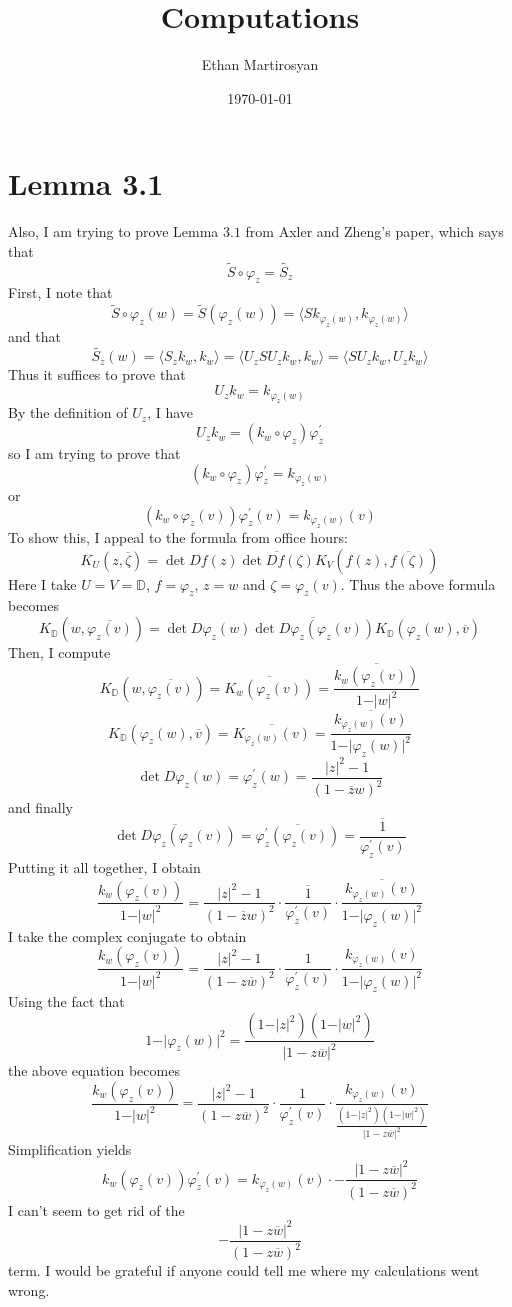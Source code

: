 \documentclass[12pt]{article}
\begin{document}
 
\title{Computations}
\author{Ethan Martirosyan}
\date{\today}
\maketitle
{}
\hfuzz=50pt
\section*{Lemma 3.1}
Also, I am trying to prove Lemma $3.1$ from Axler and Zheng's paper, which says that $$\tilde{S} \circ \varphi_z = \widetilde{S_z}$$ First, I note that $$\tilde{S} \circ \varphi_z (w) = \tilde{S}(\varphi_z(w)) = \langle Sk_{\varphi_z(w)}, k_{\varphi_z(w)} \rangle$$ and that $$\widetilde{S_z}(w) = \langle S_z k_w, k_w \rangle = \langle U_z S U_z k_w, k_w \rangle = \langle S U_z k_w,  U_z k_w \rangle$$ Thus it suffices to prove that $$U_z k_w = k_{\varphi_z(w)}$$ By the definition of $U_z$, I have $$U_z k_w = (k_w \circ \varphi_z) \varphi_z^\prime$$ so I am trying to prove that $$(k_w \circ \varphi_z) \varphi_z^\prime = k_{\varphi_z(w)}$$ or $$(k_w \circ \varphi_z(v)) \varphi_z^\prime(v) = k_{\varphi_z(w)}(v)$$ To show this, I appeal to the formula from office hours: $$K_U(z, \overline{\zeta}) = \det Df(z) \overline{\det Df(\zeta)}  K_V(f(z), \overline{f(\zeta)})$$ Here I take $U = V = \mathbb{D}$, $f = \varphi_z$, $z = w$ and $\zeta = \varphi_z(v)$. Thus the above formula becomes $$K_\mathbb{D}(w,\overline{\varphi_z(v)}) = \det D \varphi_z(w) \overline{\det D \varphi_z(\varphi_z(v))} K_\mathbb{D}(\varphi_z(w), \overline{v})$$ Then, I compute $$K_\mathbb{D}(w,\overline{\varphi_z(v)}) = \overline{K_w(\varphi_z(v))} = \overline{\frac{k_w(\varphi_z(v))}{1 - \vert w \vert^2}}$$ $$K_\mathbb{D}(\varphi_z(w), \overline{v}) = \overline{K_{\varphi_z(w)}(v)} = \overline{\frac{k_{\varphi_z(w)}(v)}{1- \vert \varphi_z(w) \vert^2}}$$ $$\det D \varphi_z(w) = \varphi_z^\prime(w) = \frac{\vert z \vert^2 - 1}{(1-\overline{z}w)^2}$$ and finally $$\overline{\det D \varphi_z(\varphi_z(v))} = \overline{\varphi_z^\prime(\varphi_z(v))} = \overline{\frac{1}{\varphi_z^\prime(v)}}$$ Putting it all together, I obtain $$\overline{\frac{k_w(\varphi_z(v))}{1 - \vert w \vert^2}} =  \frac{\vert z \vert^2 - 1}{(1-\overline{z}w)^2} \cdot  \overline{\frac{1}{\varphi_z^\prime(v)}} \cdot  \overline{\frac{k_{\varphi_z(w)}(v)}{1- \vert \varphi_z(w) \vert^2}}$$ I take the complex conjugate to obtain $$\frac{k_w(\varphi_z(v))}{1 - \vert w \vert^2} =  \frac{\vert z \vert^2 - 1}{(1-z\overline{w})^2} \cdot  \frac{1}{\varphi_z^\prime(v)} \cdot  \frac{k_{\varphi_z(w)}(v)}{1- \vert \varphi_z(w) \vert^2}$$ Using the fact that $$1 - \vert \varphi_z(w)\vert^2 = \frac{(1-\vert z \vert^2)(1- \vert w \vert^2)}{\vert 1 - z \overline{w} \vert^2}$$ the above equation becomes $$\frac{k_w(\varphi_z(v))}{1 - \vert w \vert^2} =  \frac{\vert z \vert^2 - 1}{(1-z\overline{w})^2} \cdot  \frac{1}{\varphi_z^\prime(v)} \cdot  \frac{k_{\varphi_z(w)}(v)}{\frac{(1-\vert z \vert^2)(1- \vert w \vert^2)}{\vert 1 - z \overline{w} \vert^2}}$$ Simplification yields $$k_w(\varphi_z(v)) \varphi_z^\prime(v) = k_{\varphi_z(w)}(v) \cdot -\frac{\vert 1- z \overline{w} \vert^2}{(1 - z \overline{w})^2} $$ I can't seem to get rid of the $$-\frac{\vert 1- z \overline{w} \vert^2}{(1 - z \overline{w})^2} $$ term. I would be grateful if anyone could tell me where my calculations went wrong.
\end{document}
